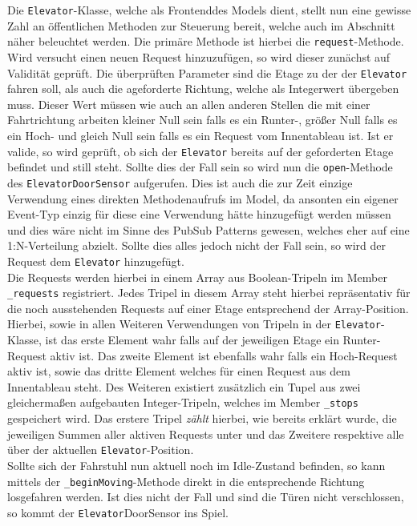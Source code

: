 Die \texttt{Elevator}-Klasse, welche als \glqq Frontend\grqq des Models dient, stellt nun eine gewisse Zahl an öffentlichen Methoden zur Steuerung bereit, welche auch im Abschnitt \textit{} näher beleuchtet werden.
Die primäre Methode ist hierbei die \texttt{request}-Methode.
Wird versucht einen neuen Request hinzuzufügen, so wird dieser zunächst auf Validität geprüft.
Die überprüften Parameter sind die Etage zu der der \texttt{Elevator} fahren soll, als auch die ageforderte Richtung, welche als Integerwert übergeben muss.
Dieser Wert müssen wie auch an allen anderen Stellen die mit einer Fahrtrichtung arbeiten kleiner Null sein falls es ein Runter-, größer Null falls es ein Hoch- und gleich Null sein falls es ein Request vom Innentableau ist.
Ist er valide, so wird geprüft, ob sich der \texttt{Elevator} bereits auf der geforderten Etage befindet und still steht.
Sollte dies der Fall sein so wird nun die \texttt{open}-Methode des \texttt{ElevatorDoorSensor} aufgerufen.
Dies ist auch die zur Zeit einzige Verwendung eines direkten Methodenaufrufs im Model, da ansonten ein eigener Event-Typ einzig für diese eine Verwendung hätte hinzugefügt werden müssen und dies wäre nicht im Sinne des PubSub Patterns gewesen, welches eher auf eine 1:N-Verteilung abzielt.
Sollte dies alles jedoch nicht der Fall sein, so wird der Request dem \texttt{Elevator} hinzugefügt. \\

Die Requests werden hierbei in einem Array aus Boolean-Tripeln im Member \texttt{\_requests} registriert.
Jedes Tripel in diesem Array steht hierbei repräsentativ für die noch ausstehenden Requests auf einer Etage entsprechend der Array-Position.
Hierbei, sowie in allen Weiteren Verwendungen von Tripeln in der \texttt{Elevator}-Klasse, ist das erste Element wahr falls auf der jeweiligen Etage ein Runter-Request aktiv ist.
Das zweite Element ist ebenfalls wahr falls ein Hoch-Request aktiv ist, sowie das dritte Element welches für einen Request aus dem Innentableau steht.
Des Weiteren existiert zusätzlich ein Tupel aus zwei gleichermaßen aufgebauten Integer-Tripeln, welches im Member \texttt{\_stops} gespeichert wird.
Das erstere Tripel \textit{zählt} hierbei, wie bereits erklärt wurde, die jeweiligen Summen aller aktiven Requests unter und das Zweitere respektive alle über der aktuellen \texttt{Elevator}-Position. \\

Sollte sich der Fahrstuhl nun aktuell noch im Idle-Zustand befinden, so kann mittels der \texttt{\_beginMoving}-Methode direkt in die entsprechende Richtung losgefahren werden.
Ist dies nicht der Fall und sind die Türen nicht verschlossen, so kommt der \texttt{Elevator}DoorSensor ins Spiel. \\

